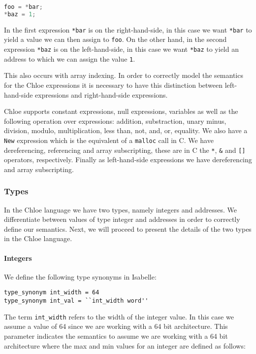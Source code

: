 \begin{lstlisting}[language=C, frame=single]
foo = *bar;
*baz = 1;
\end{lstlisting}

In the first expression \verb|*bar| is on the right-hand-side, in this case we want \verb|*bar| to yield a value we can then assign to \verb|foo|.
On the other hand, in the second expression \verb|*baz| is on the left-hand-side, in this case we want \verb|*baz| to yield an address to which we can assign the value \verb|1|.

This also occurs with array indexing.
In order to correctly model the semantics for the Chloe expressions it is necessary to have this distinction between left-hand-side expressions and right-hand-side expressions.

Chloe supports constant expressions, null expressions, variables as well as the following operation over expressions: addition, substraction, unary minus, division, modulo, multiplication, less than, not, and, or, equality.
We also have a \verb|New| expression which is the equivalent of a \verb|malloc| call in C.
We have dereferencing, referencing and array subscripting, these are in C the \verb|*|, \verb|&| and \verb|[]| operators, respectively.
Finally as left-hand-side expressions we have dereferencing and array subscripting.

\subsubsection{Types}

In the Chloe language we have two types, namely integers and addresses.
We differentiate between values of type integer and addresses in order to correctly define our semantics.
Next, we will proceed to present the details of the two types in the Chloe language.

\paragraph{Integers}

We define the following type synonyms in Isabelle:

\begin{lstlisting}[frame=single]
type_synonym int_width = 64
type_synonym int_val = ``int_width word''
\end{lstlisting}


The term \verb|int_width| refers to the width of the integer value.
In this case we assume a value of 64 since we are working with a 64 bit architecture.
This parameter indicates the semantics to assume we are working with a 64 bit architecture where the max and min values for an integer are defined as follows:

